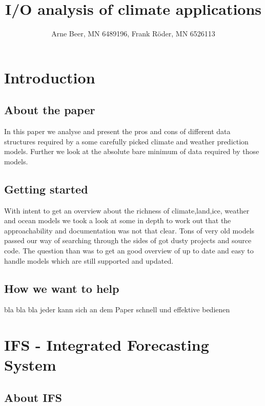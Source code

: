 \documentclass[]{article}
\title{I/O analysis of climate applications}
\author{Arne Beer, MN 6489196, Frank Röder, MN 6526113}
\date{}
\begin{document}
\maketitle

{
\setcounter{tocdepth}{3}
\tableofcontents
}
\pagebreak

\section{Introduction}\label{introduction}

\subsection{About the paper}\label{about-the-paper}

In this paper we analyse and present the pros and cons of different data
structures required by a some carefully picked climate and weather
prediction models. Further we look at the absolute bare minimum of data
required by those models.

\subsection{Getting started}\label{getting-started}

With intent to get an overview about the richness of climate,land,ice,
weather and ocean models we took a look at some in depth to work out
that the approachability and documentation was not that clear. Tons of
very old models passed our way of searching through the sides of got
dusty projects and source code. The question than was to get an good
overview of up to date and easy to handle models which are still
supported and updated.

\subsection{How we want to help}\label{how-we-want-to-help}

bla bla bla jeder kann sich an dem Paper schnell und effektive bedienen

\section{IFS - Integrated Forecasting
System}\label{ifs---integrated-forecasting-system}

\subsection{About IFS}\label{about-ifs}
\end{document}
